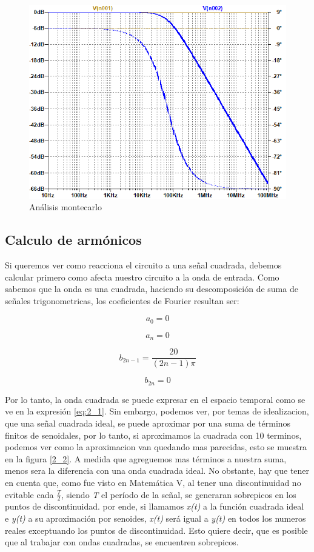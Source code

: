 \begin{figure}[h]
\begin{centering}
\includegraphics[scale=0.5]{../Ex2/resources2/montecarlo}
\par\end{centering}
\caption{Análisis montecarlo}
\label{2_5}
\end{figure}

\subsection{Calculo de armónicos}

Si queremos ver como reacciona el circuito a una señal cuadrada, debemos
calcular primero como afecta nuestro circuito a la onda de entrada.
Como sabemos que la onda es una cuadrada, haciendo su descomposición
de suma de señales trigonometricas, los coeficientes de Fourier resultan
ser:

\[
a_{0}=0
\]

\[
a_{n}=0
\]

\[
b_{2n-1}=\frac{20}{(2n-1)\pi}
\]

\[
b_{2n}=0
\]

Por lo tanto, la onda cuadrada se puede expresar en el espacio temporal
como se ve en la expresión \ref{eq:2_1}. Sin embargo, podemos ver,
por temas de idealizacion, que una señal cuadrada ideal, se puede
aproximar por una suma de términos finitos de senoidales, por lo tanto,
si aproximamos la cuadrada con 10 terminos, podemos ver como la aproximacion
van quedando mas parecidas, esto se muestra en la figura \ref{2_2}.
A medida que agreguemos mas términos a nuestra suma, menos sera la
diferencia con una onda cuadrada ideal. No obstante, hay que tener
en cuenta que, como fue visto en Matemática V, al tener una discontinuidad
no evitable cada $\frac{T}{2}$, siendo \emph{T} el período de la
señal, se generaran sobrepicos en los puntos de discontinuidad. por
ende, si llamamos \emph{x(t)} a la función cuadrada ideal e \emph{y(t)}
a su aproximación por senoides, \emph{x(t)} será igual a \emph{y(t)
}en todos los numeros reales exceptuando los puntos de discontinuidad.
Esto quiere decir, que es posible que al trabajar con ondas cuadradas,
se encuentren sobrepicos.

